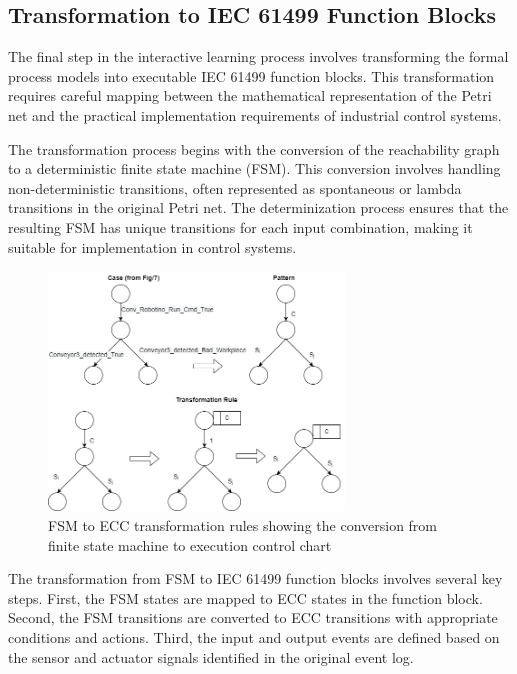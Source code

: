 \subsection{Transformation to IEC 61499 Function Blocks}

The final step in the interactive learning process involves transforming the formal process models into executable IEC 61499 function blocks. This transformation requires careful mapping between the mathematical representation of the Petri net and the practical implementation requirements of industrial control systems.

The transformation process begins with the conversion of the reachability graph to a deterministic finite state machine (FSM). This conversion involves handling non-deterministic transitions, often represented as spontaneous or lambda transitions in the original Petri net. The determinization process ensures that the resulting FSM has unique transitions for each input combination, making it suitable for implementation in control systems.

\begin{figure}[h]
    \centering
    \includegraphics[width=0.7\textwidth]{MX_Papers/Paper6/images/UpdatedControllerConversionrules.png}
    \caption{FSM to ECC transformation rules showing the conversion from finite state machine to execution control chart}
    \label{fig:fsm_to_ecc_transformation}
\end{figure}

The transformation from FSM to IEC 61499 function blocks involves several key steps. First, the FSM states are mapped to ECC states in the function block. Second, the FSM transitions are converted to ECC transitions with appropriate conditions and actions. Third, the input and output events are defined based on the sensor and actuator signals identified in the original event log.

